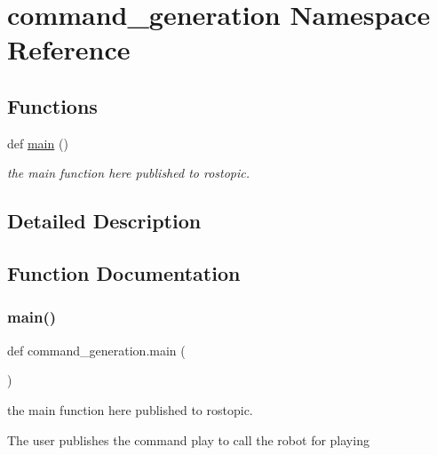 \hypertarget{namespacecommand__generation}{}\section{command\+\_\+generation Namespace Reference}
\label{namespacecommand__generation}
\subsection*{Functions}
\begin{DoxyCompactItemize}
\item 
def \hyperlink{namespacecommand__generation_af7f8b77f85afe773fee4770435f86060}{main} ()
\begin{DoxyCompactList}\small\item\em the main function here published to rostopic. \end{DoxyCompactList}\end{DoxyCompactItemize}


\subsection{Detailed Description}
 

\subsection{Function Documentation}
\mbox{\label{namespacecommand__generation_af7f8b77f85afe773fee4770435f86060}} 
\subsubsection{\texorpdfstring{main()}{main()}}
{\footnotesize\ttfamily def command\+\_\+generation.\+main (\begin{DoxyParamCaption}{ }\end{DoxyParamCaption})}



the main function here published to rostopic. 

The user publishes the command play to call the robot for playing 